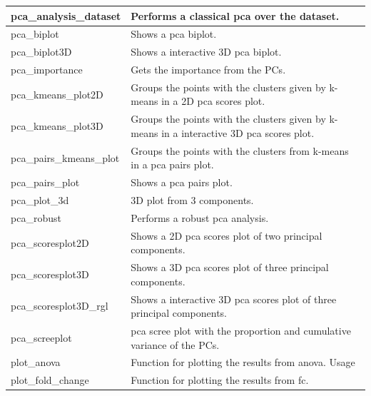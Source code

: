 \begin{scriptsize}
\begin{longtable}{|m{4.3cm}|m{11cm}|}
		\hline
		pca\_analysis\_dataset & Performs a classical \gls{pca} over the dataset. \\
		
		\hline
		pca\_biplot & Shows a \gls{pca} biplot. \\
		
		\hline
		pca\_biplot3D & Shows a interactive 3D \gls{pca} biplot. \\
		
		\hline 
		pca\_importance & Gets the importance from the PCs. \\
		
		\hline
		pca\_kmeans\_plot2D & Groups the points with the clusters given by k-means in a 2D \gls{pca} scores plot. \\
		
		\hline
		pca\_kmeans\_plot3D & Groups the points with the clusters given by k-means in a interactive 3D \gls{pca} scores plot. \\
		
		\hline
		pca\_pairs\_kmeans\_plot & Groups the points with the clusters from k-means in a \gls{pca} pairs plot. \\
		
		\hline
		pca\_pairs\_plot & Shows a \gls{pca} pairs plot. \\
		
		\hline
		pca\_plot\_3d & 3D plot from 3 components. \\
		
		\hline
		pca\_robust & Performs a robust \gls{pca} analysis. \\
		
		\hline
		pca\_scoresplot2D & Shows a 2D \gls{pca} scores plot of two principal components. \\
		
		\hline
		pca\_scoresplot3D & Shows a 3D \gls{pca} scores plot of three principal components. \\
		
		\hline
		pca\_scoresplot3D\_rgl & Shows a interactive 3D \gls{pca} scores plot of three principal components. \\
		
		\hline
		pca\_screeplot & \gls{pca} scree plot with the proportion and cumulative variance of the PCs. \\
		
		\hline
		plot\_anova & Function for plotting the results from \gls{anova}.
		Usage \\
		
		\hline
		plot\_fold\_change & Function for plotting the results from \gls{fc}. \\
		

\end{longtable}
\end{scriptsize}
